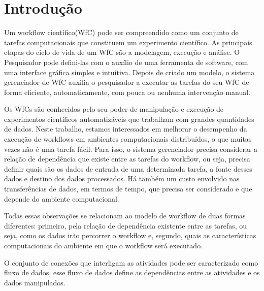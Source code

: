 
\section{Introdução}

	Um workflow científico(WfC) pode ser compreendido como um conjunto de tarefas computacionais que constituem um experimento científico\cite{Junior2012}. As principais etapas do ciclo de vida de um WfC são a modelagem, execução e análise. O Pesquisador pode defini-las com o auxílio de uma ferramenta de software, com uma interface gráfica simples e intuitiva. Depois de criado um modelo, o sistema gerenciador de WfC auxilia o pesquisador a executar as tarefas do seu WfC de forma eficiente, automaticamente, com pouca ou nenhuma intervenção manual.
	
	Os WfCs são conhecidos pelo seu poder de manipulação e execução de experimentos científicos automatizáveis que trabalham com grandes quantidades de dados. Neste trabalho, estamos interessados em melhorar o desempenho da execução de workflows em ambientes computacionais distribuídos, o que muitas vezes não é uma tarefa fácil. Para isso, o sistema gerenciador precisa considerar a relação de dependência que existe entre as tarefas do workflow, ou seja, precisa definir quais são os dados de entrada de uma determinada tarefa, a fonte desses dados e destino dos dados processados. Há também um custo envolvido nas transferências de dados, em termos de tempo, que precisa ser considerado e que depende do ambiente computacional.

	Todas essas observações se relacionam ao modelo de workflow de duas formas diferentes: primeiro, pela relação de dependência existente entre as tarefas, ou seja, como os dados irão percorrer o workflow e, segundo, quais as características computacionais do ambiente em que o workflow será executado.
	
	O conjunto de conexões que interligam as atividades pode ser caracterizado como fluxo de dados, esse fluxo de dados define as dependências entre as atividades e os dados manipulados\cite{Teixeira2013}.
